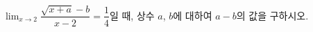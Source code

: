 $\displaystyle\lim_{x\to 2}\dfrac{\sqrt{x+a}-b}{x-2}=\dfrac{1}{4}$일 때, 상수 $a$, $b$에 대하여 $a-b$의 값을 구하시오.
